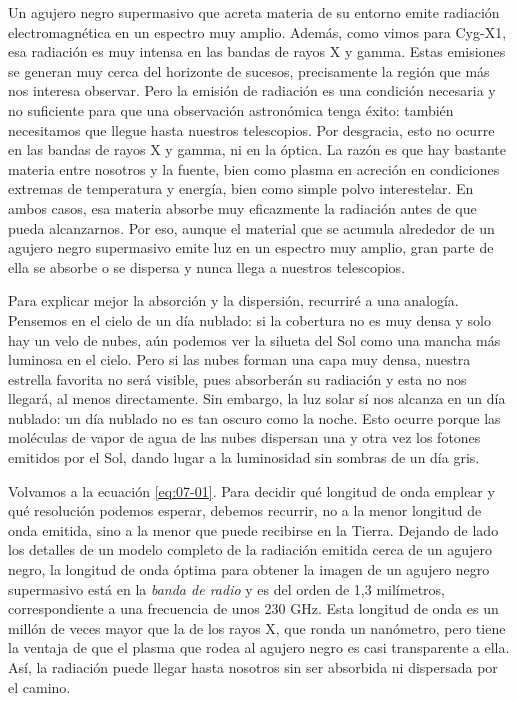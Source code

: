 Un agujero negro supermasivo que acreta materia de su entorno emite radiación electromagnética en un espectro muy amplio. Además, como vimos para Cyg-X1, esa radiación es muy intensa en las bandas de rayos X y gamma. Estas emisiones se generan muy cerca del horizonte de sucesos, precisamente la región que más nos interesa observar. Pero la emisión de radiación es una condición necesaria y no suficiente para que una observación astronómica tenga éxito: también necesitamos que llegue hasta nuestros telescopios. Por desgracia, esto no ocurre en las bandas de rayos X y gamma, ni en la óptica. La razón es que hay bastante materia entre nosotros y la fuente, bien como plasma en acreción en condiciones extremas de temperatura y energía, bien como simple polvo interestelar. En ambos casos, esa materia absorbe muy eficazmente la radiación antes de que pueda alcanzarnos. Por eso, aunque el material que se acumula alrededor de un agujero negro supermasivo emite luz en un espectro muy amplio, gran parte de ella se absorbe o se dispersa y nunca llega a nuestros telescopios.

Para explicar mejor la absorción y la dispersión, recurriré a una analogía. Pensemos en el cielo de un día nublado: si la cobertura no es muy densa y solo hay un velo de nubes, aún podemos ver la silueta del Sol como una mancha más luminosa en el cielo. Pero si las nubes forman una capa muy densa, nuestra estrella favorita no será visible, pues absorberán su radiación y esta no nos llegará, al menos directamente. Sin embargo, la luz solar sí nos alcanza en un día nublado: un día nublado no es tan oscuro como la noche. Esto ocurre porque las moléculas de vapor de agua de las nubes dispersan una y otra vez los fotones emitidos por el Sol, dando lugar a la luminosidad sin sombras de un día gris.

Volvamos a la ecuación \eqref{eq:07-01}. Para decidir qué longitud de onda emplear y qué resolución podemos esperar, debemos recurrir, no a la menor longitud de onda emitida, sino a la menor que puede recibirse en la Tierra. Dejando de lado los detalles de un modelo completo de la radiación emitida cerca de un agujero negro, la longitud de onda óptima para obtener la imagen de un agujero negro supermasivo está en la \emph{banda de radio} y es del orden de 1,3 milímetros, correspondiente a una frecuencia de unos 230 GHz. Esta longitud de onda es un millón de veces mayor que la de los rayos X, que ronda un nanómetro, pero tiene la ventaja de que el plasma que rodea al agujero negro es casi transparente a ella. Así, la radiación puede llegar hasta nosotros sin ser absorbida ni dispersada por el camino.

